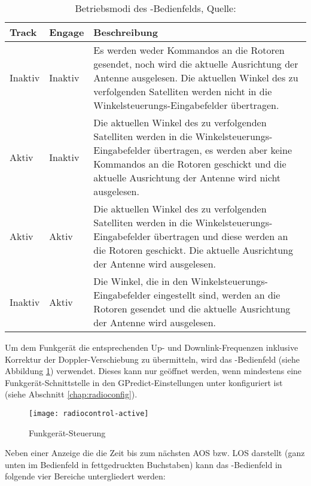\begin{table}[h]
	\begin{tabularx}{\textwidth}{|l|l|X|}
		\hline
		\textbf{Track} 	    & \textbf{Engage}	&\textbf{Beschreibung}\\
		\hline
		Inaktiv          	& Inaktiv 			& Es werden weder Kommandos an die Rotoren gesendet, noch wird die aktuelle Ausrichtung der Antenne ausgelesen. Die aktuellen Winkel des zu verfolgenden Satelliten werden nicht in die Winkelsteuerungs-Eingabefelder übertragen.\\
		Aktiv              	& Inaktiv   		& Die aktuellen Winkel des zu verfolgenden Satelliten werden in die Winkelsteuerungs-Eingabefelder übertragen, es werden aber keine Kommandos an die Rotoren geschickt und die aktuelle Ausrichtung der Antenne wird nicht ausgelesen.\\
		Aktiv              	& Aktiv	            & Die aktuellen Winkel des zu verfolgenden Satelliten werden in die Winkelsteuerungs-Eingabefelder übertragen und diese werden an die Rotoren geschickt. Die aktuelle Ausrichtung der Antenne wird ausgelesen.\\
		Inaktiv            	& Aktiv   			& Die Winkel, die in den Winkelsteuerungs-Eingabefelder eingestellt sind, werden an die Rotoren gesendet und die aktuelle Ausrichtung der Antenne wird ausgelesen.\\
		\hline		
	\end{tabularx}
	\caption{Betriebsmodi des -Bedienfelds, Quelle: \cite{gpredictmanual} \vspace{-2em}}
	\label{tab:rotatorcontrolmodes}
\end{table}

\newpage

Um dem Funkgerät die entsprechenden Up- und Downlink-Frequenzen inklusive Korrektur der Doppler-Verschiebung zu übermitteln, wird das -Bedienfeld (siehe Abbildung \ref{fig:radiocontrol}) verwendet. Dieses kann nur geöffnet werden, wenn mindestens eine Funkgerät-Schnittstelle in den GPredict-Einstellungen unter  konfiguriert ist (siehe Abschnitt \ref{chap:radioconfig}).

\begin{figure}[h]
	\centering
	\texttt{[image: radiocontrol-active]}
	\caption{Funkgerät-Steuerung}
	\label{fig:radiocontrol} 
\end{figure}

Neben einer Anzeige die die Zeit bis zum nächsten \ac{AOS} bzw. \ac{LOS} darstellt (ganz unten im Bedienfeld in fettgedruckten Buchstaben) kann das -Bedienfeld in folgende vier Bereiche untergliedert werden:


